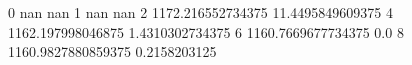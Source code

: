 0 nan nan
1 nan nan
2 1172.216552734375 11.4495849609375
4 1162.197998046875 1.4310302734375
6 1160.7669677734375 0.0
8 1160.9827880859375 0.2158203125
